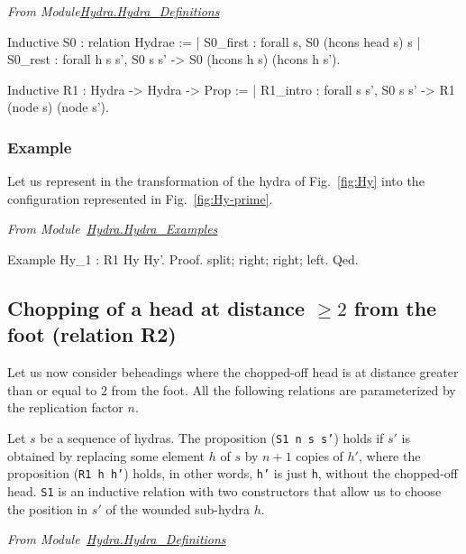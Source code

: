 \documentclass[a4paper]{book}
\begin{document}
\vspace{4pt}\emph{From Module\href{../src/html/hydras.Hydra.Hydra_Definitions.html}{Hydra.Hydra\_Definitions}}

\begin{Coqsrc}
Inductive S0 :  relation Hydrae :=
| S0_first : forall s, S0  (hcons head s) s
| S0_rest : forall  h s s',  S0  s s' ->
                             S0  (hcons h s) (hcons h s').

Inductive R1  :  Hydra -> Hydra -> Prop :=
| R1_intro : forall s s', S0 s s' -> R1 (node s) (node s').
\end{Coqsrc}

\subsubsection{Example}
\label{sec:orgheadline45}

Let us represent in \coq{}   the transformation of the hydra of Fig.~\vref{fig:Hy} into
the configuration represented in Fig.~\ref{fig:Hy-prime}.

\vspace{4pt}
\emph{From Module~\href{../src/html/hydras.Hydra.Hydra_Examples.html}{Hydra.Hydra\_Examples}}


\begin{Coqsrc}
Example Hy_1 : R1 Hy Hy'.
Proof. 
  split; right; right; left.
Qed.
\end{Coqsrc}


\subsection{Chopping of a head at distance \texorpdfstring{$\geq 2$}{>= 2} from the foot (relation R2) }


Let us now consider beheadings  where the chopped-off head is at distance greater than or equal to $2$ from the foot. All the following relations are parameterized by the replication factor  $n$.

 Let $s$ be a sequence of hydras. 
The proposition (\texttt{S1 n s s'}) holds if $s'$ is obtained by replacing some element $h$ of $s$ by 
$n+1$ copies of $h'$, where  the proposition (\texttt{R1 h h'}) holds, in other words, \texttt{h'} is just \texttt{h}, without the chopped-off  head. \texttt{S1} is an inductive relation with two constructors that allow us to choose the position in $s'$ of the wounded sub-hydra $h$.

\vspace{4pt}
\emph{From Module~\href{../src/html/hydras.Hydra.Hydra_Definitions.html\#S1}{Hydra.Hydra\_Definitions}}
\end{document}
